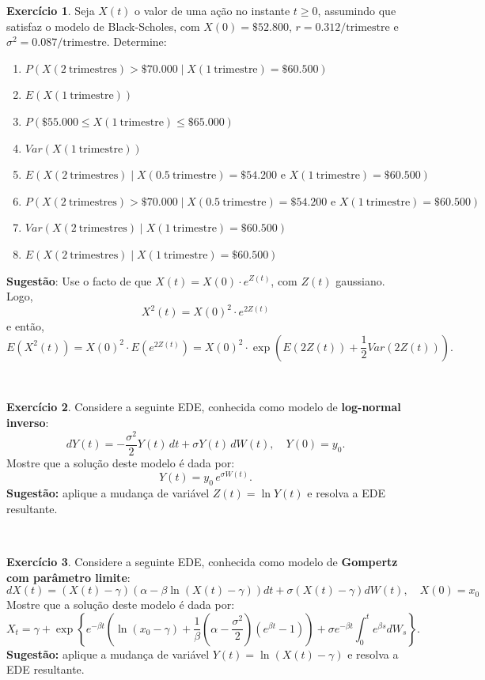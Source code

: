 \documentclass[
  11pt,
  a4paper,
]{book}
\theoremstyle{definition}
\theoremstyle{definition}
\theoremstyle{definition}
\newtheorem{exercise}{Exercício}[chapter]
\theoremstyle{definition}
\theoremstyle{remark}
\begin{document}
\begin{exercise}
Seja \(X(t)\) o valor de uma ação no instante \(t \geq 0\), assumindo que satisfaz o modelo de Black-Scholes, com \(X(0) = \$52.800\), \(r = 0.312/\text{trimestre}\) e \(\sigma^2 = 0.087/\text{trimestre}\). Determine:

\begin{enumerate}
\def\labelenumi{(\alph{enumi})}
\item
  \(P(X(2\ \text{trimestres}) > \$70.000 \mid X(1\ \text{trimestre}) = \$60.500)\)
\item
  \(E(X(1\ \text{trimestre}))\)
\item
  \(P(\$55.000 \leq X(1\ \text{trimestre}) \leq \$65.000)\)
\item
  \(Var(X(1\ \text{trimestre}))\)
\item
  \(E(X(2\ \text{trimestres}) \mid X(0.5\ \text{trimestre}) = \$54.200 \text{ e } X(1\ \text{trimestre}) = \$60.500)\)
\item
  \(P(X(2\ \text{trimestres}) > \$70.000 \mid X(0.5\ \text{trimestre}) = \$54.200 \text{ e } X(1\ \text{trimestre}) = \$60.500)\)
\item
  \(Var(X(2\ \text{trimestres}) \mid X(1\ \text{trimestre}) = \$60.500)\)
\item
  \(E(X(2\ \text{trimestres}) \mid X(1\ \text{trimestre}) = \$60.500)\)
\end{enumerate}

\textbf{Sugestão}: Use o facto de que \(X(t) = X(0) \cdot e^{Z(t)}\), com \(Z(t)\) gaussiano. Logo,
\[
X^2(t) = X(0)^2 \cdot e^{2Z(t)}
\]
e então,
\[
E(X^2(t)) = X(0)^2 \cdot E(e^{2Z(t)}) = X(0)^2 \cdot \exp\left( E(2Z(t)) + \frac{1}{2} Var(2Z(t)) \right).
\]
\end{exercise}

\(\,\)

\begin{exercise}
Considere a seguinte EDE, conhecida como modelo de \textbf{log-normal inverso}:
\[
dY(t) = -\frac{\sigma^2}{2} Y(t)\,dt + \sigma Y(t)\,dW(t), \quad Y(0)=y_0.
\]
Mostre que a solução deste modelo é dada por:
\[
Y(t) = y_0\,e^{\sigma W(t)}.
\]
\textbf{Sugestão:} aplique a mudança de variável \(Z(t) = \ln Y(t)\) e resolva a EDE resultante.
\end{exercise}

\(\,\)

\begin{exercise}
Considere a seguinte EDE, conhecida como modelo de \textbf{Gompertz com parâmetro limite}:
\[
dX(t)=(X(t)-\gamma)(\alpha-\beta\ln(X(t)-\gamma))dt + \sigma (X(t)-\gamma)dW(t), \quad X(0)=x_0
\]
Mostre que a solução deste modelo é dada por:
\[
X_t=\gamma+\exp\left\{e^{-\beta t}\left(\ln(x_0-\gamma)+\frac{1}{\beta}\left(\alpha-\frac{\sigma^2}{2}\right)(e^{\beta t}-1)\right)+\sigma e^{-\beta t}\int_{0}^{t}{e^{\beta s}}dW_s\right\}.
\]
\textbf{Sugestão:} aplique a mudança de variável \(Y(t)=\ln(X(t)-\gamma)\) e resolva a EDE resultante.
\end{exercise}
\end{document}
